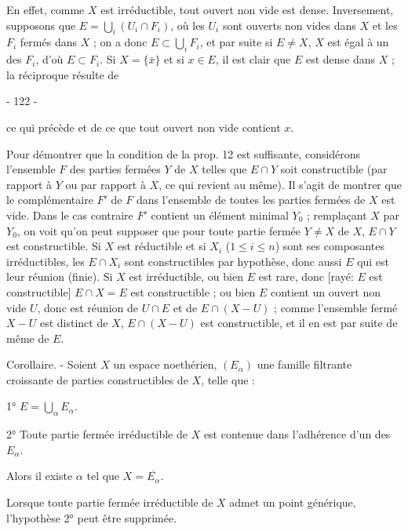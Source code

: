En effet, comme $X$ est irréductible, tout ouvert non vide est dense. Inversement, supposons que $E = \bigcup_i (U_i \cap F_i)$, où les $U_i$ sont ouverts non vides dans $X$ et les $F_i$ fermés dans $X$ ; on a donc $E \subset \bigcup_i F_i$, et par suite si $E \neq X$, $X$ est égal à un des $F_i$, d'où $E \subset F_i$. Si $X = \{\bar{x}\}$ et si $x \in E$, il est clair que $E$ est dense dans $X$ ; la réciproque résulte de

\newpage


- 122 -

ce qui précède et de ce que tout ouvert non vide contient $x$.

Pour démontrer que la condition de la prop. 12 est suffisante, considérons l'ensemble $F$ des parties fermées $Y$ de $X$ telles que $E \cap Y$ soit constructible (par rapport à $Y$ ou par rapport à $X$, ce qui revient au même). Il s'agit de montrer que le complémentaire $F'$ de $F$ dans l'ensemble de toutes les parties fermées de $X$ est vide. Dans le cas contraire $F'$ contient un élément minimal $Y_0$ ; remplaçant $X$ par $Y_0$, on voit qu'on peut supposer que pour toute partie fermée $Y \neq X$ de $X$, $E \cap Y$ est constructible. Si $X$ est réductible et si $X_i$ ($1 \leq i \leq n$) sont ses composantes irréductibles, les $E \cap X_i$ sont constructibles par hypothèse, donc aussi $E$ qui est leur réunion (finie). Si $X$ est irréductible, ou bien $E$ est rare, donc [rayé: $E$ est constructible] $E \cap X = E$ est constructible ; ou bien $E$ contient un ouvert non vide $U$, donc est réunion de $U \cap E$ et de $E \cap (X-U)$ ; comme l'ensemble fermé $X-U$ est distinct de $X$, $E \cap (X-U)$ est constructible, et il en est par suite de même de $E$.

Corollaire. - Soient $X$ un espace noethérien, $(E_{\alpha})$ une famille filtrante croissante de parties constructibles de $X$, telle que :

1° $E = \bigcup_{\alpha} E_{\alpha}$.

2° Toute partie fermée irréductible de $X$ est contenue dans l'adhérence d'un des $E_{\alpha}$.

Alors il existe $\alpha$ tel que $X = \overline{E_{\alpha}}$.

Lorsque toute partie fermée irréductible de $X$ admet un point générique, l'hypothèse 2° peut être supprimée.

\newpage


